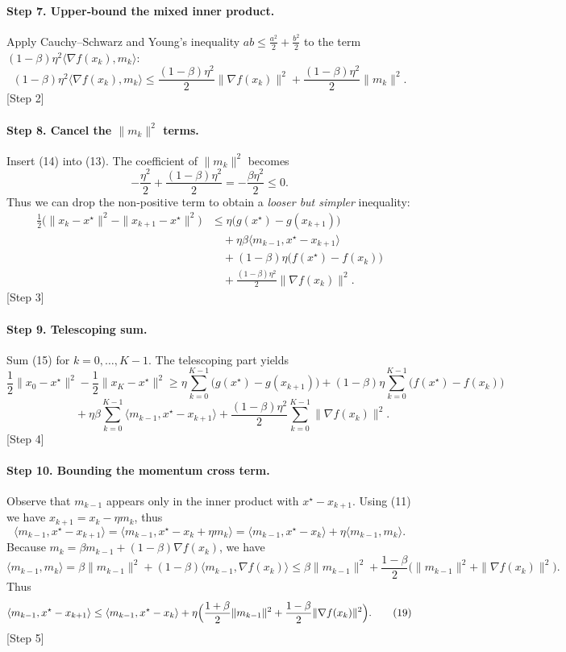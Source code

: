 \documentclass{article}
\begin{document}
\paragraph{Step 7. Upper‑bound the mixed inner product.}
Apply Cauchy–Schwarz and Young’s inequality $ab\le \frac{a^{2}}{2}+\frac{b^{2}}{2}$ to the term $(1-\beta)\eta^{2}\langle\nabla f(x_{k}),m_{k}\rangle$:
\[
(1-\beta)\eta^{2}\langle\nabla f(x_{k}),m_{k}\rangle
\le \frac{(1-\beta)\eta^{2}}{2}\|\nabla f(x_{k})\|^{2}
+\frac{(1-\beta)\eta^{2}}{2}\|m_{k}\|^{2}.
\tag{14}
\]
[Step 2]

\paragraph{Step 8. Cancel the $\|m_{k}\|^{2}$ terms.}
Insert (14) into (13). The coefficient of $\|m_{k}\|^{2}$ becomes
\[
-\frac{\eta^{2}}{2}+\frac{(1-\beta)\eta^{2}}{2}= -\frac{\beta\eta^{2}}{2}\le0 .
\]
Thus we can drop the non‑positive term to obtain a \emph{looser but simpler} inequality:
\begin{align}
\frac{1}{2}\bigl(\|x_{k}-x^{\star}\|^{2}-\|x_{k+1}-x^{\star}\|^{2}\bigr)
&\le \eta\bigl(g(x^{\star})-g(x_{k+1})\bigr) \nonumber\\
&\quad +\eta\beta\langle m_{k-1},x^{\star}-x_{k+1}\rangle \nonumber\\
&\quad +(1-\beta)\eta\bigl(f(x^{\star})-f(x_{k})\bigr) \nonumber\\
&\quad +\frac{(1-\beta)\eta^{2}}{2}\|\nabla f(x_{k})\|^{2}.
\tag{15}
\end{align}
[Step 3]

\paragraph{Step 9. Telescoping sum.}
Sum (15) for $k=0,\dots,K-1$. The telescoping part yields
\[
\frac{1}{2}\|x_{0}-x^{\star}\|^{2}
-\frac{1}{2}\|x_{K}-x^{\star}\|^{2}
\ge
\eta\sum_{k=0}^{K-1}\bigl(g(x^{\star})-g(x_{k+1})\bigr)
+(1-\beta)\eta\sum_{k=0}^{K-1}\bigl(f(x^{\star})-f(x_{k})\bigr)
\]
\[
\qquad\qquad
+\eta\beta\sum_{k=0}^{K-1}\langle m_{k-1},x^{\star}-x_{k+1}\rangle
+\frac{(1-\beta)\eta^{2}}{2}\sum_{k=0}^{K-1}\|\nabla f(x_{k})\|^{2}.
\tag{16}
\]
[Step 4]

\paragraph{Step 10. Bounding the momentum cross term.}
Observe that $m_{k-1}$ appears only in the inner product with $x^{\star}-x_{k+1}$. Using (11) we have $x_{k+1}=x_{k}-\eta m_{k}$, thus
\[
\langle m_{k-1},x^{\star}-x_{k+1}\rangle
= \langle m_{k-1},x^{\star}-x_{k}+\eta m_{k}\rangle
= \langle m_{k-1},x^{\star}-x_{k}\rangle+\eta\langle m_{k-1},m_{k}\rangle .
\tag{17}
\]
Because $m_{k}= \beta m_{k-1}+(1-\beta)\nabla f(x_{k})$, we have
\[
\langle m_{k-1},m_{k}\rangle = \beta\|m_{k-1}\|^{2}+(1-\beta)\langle m_{k-1},\nabla f(x_{k})\rangle
\le \beta\|m_{k-1}\|^{2}+\frac{1-\beta}{2}\bigl(\|m_{k-1}\|^{2}+\|\nabla f(x_{k})\|^{2}\bigr).
\tag{18}
\]
Thus
\[
\langle m_{k-1},x^{\star}-x_{k+1}\rangle
\le \langle m_{k-1},x^{\star}-x_{k}\rangle
+\eta\Bigl(\frac{1+\beta}{2}\|m_{k-1}\|^{2}+\frac{1-\beta}{2}\|\nabla f(x_{k})\|^{2}\Bigr).
\tag{19}
\]
[Step 5]
\end{document}
